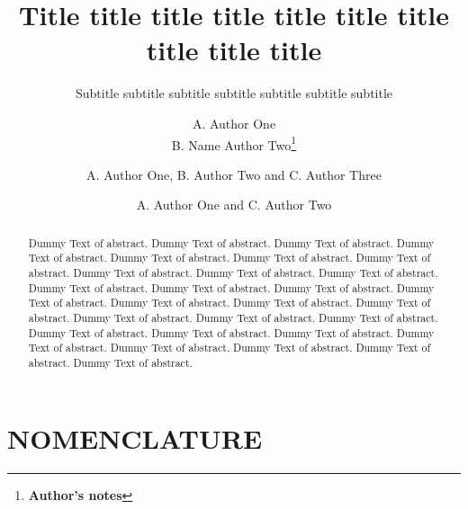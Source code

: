 \documentclass{aer}      %
\begin{document}
\title{Title title title title title title title title title title} %
\subtitle{Subtitle subtitle subtitle subtitle subtitle subtitle subtitle}






\author{A. Author One\\ B. Name Author Two\thanks{{\bf Author's notes}}}


\author{A. Author One, B. Author Two and C. Author Three}

\author{A. Author One and C. Author Two}

\maketitle                   %

\begin{abstract}
Dummy Text of abstract. Dummy Text of abstract. Dummy Text of abstract. Dummy Text of abstract. Dummy Text of abstract. Dummy Text of abstract. Dummy Text of abstract. Dummy Text of abstract. Dummy Text of abstract. Dummy Text of abstract. Dummy Text of abstract. Dummy Text of abstract. Dummy Text of abstract. Dummy Text of abstract. Dummy Text of abstract. Dummy Text of abstract. Dummy Text of abstract. Dummy Text of abstract. Dummy Text of abstract. Dummy Text of abstract. Dummy Text of abstract. Dummy Text of abstract. Dummy Text of abstract. Dummy Text of abstract. Dummy Text of abstract. Dummy Text of abstract. Dummy Text of abstract. Dummy Text of abstract.
\end{abstract}



\section*{NOMENCLATURE}
\begin{deflist}
\end{deflist}
\end{document}

